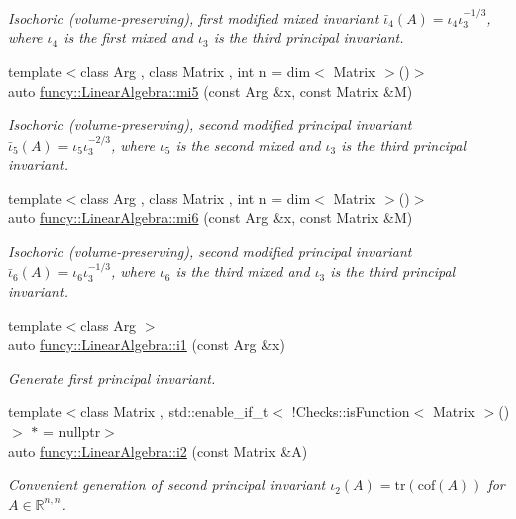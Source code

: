 \begin{DoxyCompactItemize}
\begin{DoxyCompactList}\small\item\em Isochoric (volume-\/preserving), first modified mixed invariant $ \bar\iota_4(A)=\iota_4\iota_3^{-1/3} $, where $\iota_4$ is the first mixed and $\iota_3$ is the third principal invariant. \end{DoxyCompactList}\item 
{\footnotesize template$<$class Arg , class Matrix , int n = dim$<$ Matrix $>$()$>$ }\\auto \hyperlink{group__InvariantGroup_ga5b7f0c80a59eead25db087d9faff597b}{funcy\-::\-Linear\-Algebra\-::mi5} (const Arg \&x, const Matrix \&M)
\begin{DoxyCompactList}\small\item\em Isochoric (volume-\/preserving), second modified principal invariant $ \bar\iota_5(A)=\iota_5\iota_3^{-2/3} $, where $\iota_5$ is the second mixed and $\iota_3$ is the third principal invariant. \end{DoxyCompactList}\item 
{\footnotesize template$<$class Arg , class Matrix , int n = dim$<$ Matrix $>$()$>$ }\\auto \hyperlink{group__InvariantGroup_gac9e1dba3b52694c37f5e297d49866053}{funcy\-::\-Linear\-Algebra\-::mi6} (const Arg \&x, const Matrix \&M)
\begin{DoxyCompactList}\small\item\em Isochoric (volume-\/preserving), second modified principal invariant $ \bar\iota_6(A)=\iota_6\iota_3^{-1/3} $, where $\iota_6$ is the third mixed and $\iota_3$ is the third principal invariant. \end{DoxyCompactList}\item 
{\footnotesize template$<$class Arg $>$ }\\auto \hyperlink{group__InvariantGroup_ga84b31b28660514e241f649d3c6f93a7c}{funcy\-::\-Linear\-Algebra\-::i1} (const Arg \&x)
\begin{DoxyCompactList}\small\item\em Generate first principal invariant. \end{DoxyCompactList}\item 
{\footnotesize template$<$class Matrix , std\-::enable\-\_\-if\-\_\-t$<$ !\-Checks\-::is\-Function$<$ Matrix $>$() $>$ $\ast$  = nullptr$>$ }\\auto \hyperlink{group__InvariantGroup_ga1d46274d7b5b03321f8136c6b11bf473}{funcy\-::\-Linear\-Algebra\-::i2} (const Matrix \&A)
\begin{DoxyCompactList}\small\item\em Convenient generation of second principal invariant $ \iota_2(A)=\mathrm{tr}(\mathrm{cof}(A)) $ for $A\in\mathbb{R}^{n,n}$. \end{DoxyCompactList}\item 

\end{DoxyCompactItemize}
